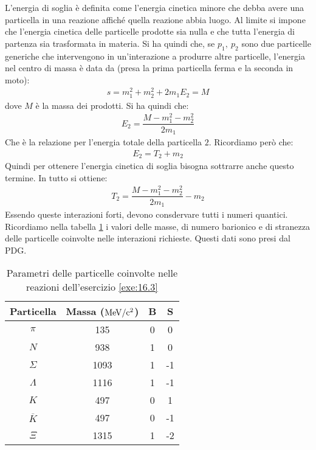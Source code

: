 \documentclass[../main.tex]{subfiles}
\begin{document}
	\begin{svol}
		L'energia di soglia è definita come l'energia cinetica minore che debba avere una particella in una reazione affiché quella reazione abbia luogo. Al limite si impone che l'energia cinetica delle particelle prodotte sia nulla e che tutta l'energia di partenza sia trasformata in materia. Si ha quindi che, se $ p_{1},\ p_{2} $ sono due particelle generiche che intervengono in un'interazione a produrre altre particelle, l'energia nel centro di massa è data da (presa la prima particella ferma e la seconda in moto):
		\begin{gather}
		s=m_{1}^{2}+m_{2}^{2}+2m_{1}E_{2}=M
		\end{gather}
		dove $ M $ è la massa dei prodotti. Si ha quindi che:
		\begin{gather}
		E_{2}=\dfrac{M-m_{1}^2-m_{2}^2}{2m_{1}}
		\end{gather}
		Che è la relazione per l'energia totale della particella $ 2 $. Ricordiamo però che:
		\begin{gather}
		E_{2}=T_{2}+m_{2}
		\end{gather}
		Quindi per ottenere l'energia cinetica di soglia bisogna sottrarre anche questo termine. In tutto si ottiene:
		\begin{gather}
		T_{2}=\dfrac{M-m_{1}^2-m_{2}^2}{2m_{1}}-m_{2}
		\end{gather}
		Essendo queste interazioni forti, devono consdervare tutti i numeri quantici. Ricordiamo nella tabella \ref{tbl:partData} i valori delle masse, di numero barionico e di stranezza delle particelle coinvolte nelle interazioni richieste. Questi dati sono presi dal PDG.
		\begin{table}[h]
			\centering
			\caption{Parametri delle particelle coinvolte nelle reazioni dell'esercizio \ref{exe:16.3}}
			\label{tbl:partData}
			\begin{tabular}{c|ccc}
				Particella & Massa ($ \si{\mega\electronvolt\per c\squared} $) & B &  S \\\hline
				$ \pi $ & 135 & 0 & 0 \\
				$ N $ & 938 & 1 & 0 \\
				$ \Sigma $ & 1093 & 1 & -1\\
				$ \Lambda $ & 1116 & 1 & -1 \\
				$ K $ & 497 & 0 & 1 \\
				$ \overline{K} $ & 497 & 0 & -1 \\
				$ \Xi $ & 1315 & 1 & -2 \\
			\end{tabular}

\end{table}
\end{svol}
\end{document}
